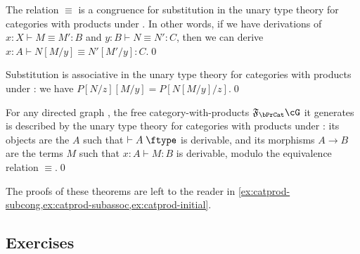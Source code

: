 \documentclass{book}
\let\types\vdash
\def\type{\;\ftype}
\newcommand{\F}[1]{\mathfrak{F}_{#1}}
\begin{document}
\begin{thm}\label{thm:catprod-subcong}
  The relation $\equiv$ is a congruence for substitution in the unary type theory for categories with products under \cG.
  In other words, if we have derivations of $x:X \types M\equiv M':B$ and $y:B \types N\equiv N':C$, then we can derive $x:A \types N[M/y] \equiv N'[M'/y]:C$.\qed
\end{thm}

\begin{thm}\label{thm:catprod-subassoc}
  Substitution is associative in the unary type theory for categories with products under \cG: we have $P[N/z][M/y] = P[N[M/y]/z]$.\qed
\end{thm}

\begin{thm}\label{thm:catprod-initial}
  For any directed graph \cG, the free category-with-products $\F\bPrCat \cG$ it generates is described by the unary type theory for categories with products under \cG: its objects are the $A$ such that $\types A\type$ is derivable, and its morphisms $A\to B$ are the terms $M$ such that $x:A \types M:B$ is derivable, modulo the equivalence relation $\equiv$.\qed
\end{thm}

The proofs of these theorems are left to the reader in \cref{ex:catprod-subcong,ex:catprod-subassoc,ex:catprod-initial}.

\subsection*{Exercises}
\end{document}
